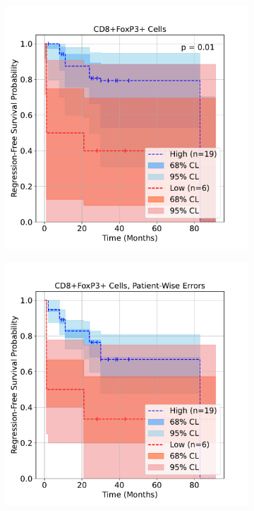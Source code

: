\documentclass[article]{jss}
\begin{document}
\begin{figure}[ht]
  \newcommand{\figwidth}{0.28\textwidth}
  \newcommand{\legendwidth}{0.13\textwidth}
  \newcommand{\movelegendup}{\vspace{-0.9cm}}
  \centering
  \begin{subfigure}[c]{\figwidth}
    \centering
    \includegraphics[width=\linewidth]{lung_cells_km_RFS.pdf}
    \caption{\label{fig:lung-dataset-cells}}
  \end{subfigure}
  \begin{subfigure}[c]{\figwidth}
    \centering
    \includegraphics[width=\linewidth]{lung_cells_km_RFS_patient_wise.pdf}

\end{subfigure}
\end{figure}
\end{document}
